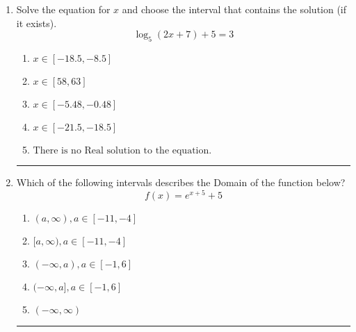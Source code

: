 \documentclass[14pt]{extbook}
\newcommand{\litem}[1]{\item#1\hspace*{-1cm}\rule{\textwidth}{0.4pt}}
\begin{document}
\begin{enumerate}
{\begin{enumerate}[label=\Alph*.]
\end{enumerate} }
\litem{
Solve the equation for $x$ and choose the interval that contains the solution (if it exists).\[ \log_{5}{(2x+7)}+5 = 3 \]\begin{enumerate}[label=\Alph*.]
\item \( x \in [-18.5, -8.5] \)
\item \( x \in [58, 63] \)
\item \( x \in [-5.48, -0.48] \)
\item \( x \in [-21.5, -18.5] \)
\item \( \text{There is no Real solution to the equation.} \)

\end{enumerate} }
\litem{
Which of the following intervals describes the Domain of the function below?\[ f(x) = e^{x+5}+5 \]\begin{enumerate}[label=\Alph*.]
\item \( (a, \infty), a \in [-11, -4] \)
\item \( [a, \infty), a \in [-11, -4] \)
\item \( (-\infty, a), a \in [-1, 6] \)
\item \( (-\infty, a], a \in [-1, 6] \)
\item \( (-\infty, \infty) \)

\end{enumerate} }
\end{enumerate}
\end{document}
